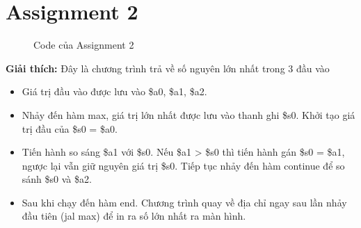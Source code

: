 \documentclass[a4paper,12pt]{article}
\begin{document}
\section{Assignment 2}
\begin{figure}[!h]
	\centerline{}
	\caption{Code của Assignment 2}
	\label{fig:ass2}
	\noindent
\end{figure}
\noindent
\textbf{Giải thích: }Đây là chương trình trả về số nguyên lớn nhất trong 3 đầu vào
\begin{itemize}
	\item Giá trị đầu vào được lưu vào \$a0, \$a1, \$a2.
	\item Nhảy đến hàm max, giá trị lớn nhất được lưu vào thanh ghi \$s0. Khởi tạo giá trị đầu của \$s0 = \$a0.
	\item Tiến hành so sáng \$a1 với \$s0. Nếu \$a1 > \$s0 thì tiến hành gán \$s0 = \$a1, ngược lại vẫn giữ nguyên giá trị \$s0. Tiếp tục nhảy đến hàm continue để so sánh \$s0 và \$a2. 
	\item Sau khi chạy đến hàm end. Chương trình quay về địa chỉ ngay sau lần nhảy đầu tiên (jal max) để in ra số lớn nhất ra màn hình.
\end{itemize}
\end{document}
